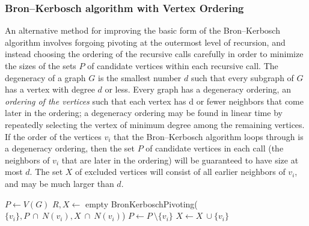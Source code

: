 \documentclass[10pt]{article} %
\begin{document}
\subsubsection{Bron–Kerbosch algorithm with Vertex Ordering}
An alternative method for improving the basic form of the Bron–Kerbosch algorithm involves forgoing pivoting at the outermost level of recursion, and instead choosing the ordering of the recursive calls carefully in order to minimize the sizes of the sets $P$ of candidate vertices within each recursive call. The degeneracy of a graph $G$ is the smallest number $d$ such that every subgraph of $G$ has a vertex with degree $d$ or less. Every graph has a degeneracy ordering, an \textit{ordering of the vertices} such that each vertex has d or fewer neighbors that come later in the ordering; a degeneracy ordering may be found in linear time by repeatedly selecting the vertex of minimum degree among the remaining vertices. If the order of the vertices $v_{i}$ that the Bron–Kerbosch algorithm loops through is a degeneracy ordering, then the set $P$ of candidate vertices in each call (the neighbors of $v_{i}$ that are later in the ordering) will be guaranteed to have size at most $d$. The set $X$ of excluded vertices will consist of all earlier neighbors of $v_{i}$, and may be much larger than $d$.
\begin{algorithm}
\caption{Bron–Kerbosch algorithm with Vertex Ordering}
\label{alg:BK with Vertex}
\begin{algorithmic}[1] %
    \State $P \gets V(G)$
    \State $R, X \gets$ empty
        \State BronKerboschPivoting($\{v_{i}\}, P\ \cap\ N(v_{i}), X\ \cap \ N(v_{i})$)
        \State $P \gets P\ \setminus \{v_{i}\}$
        \State $X \gets X\ \cup \{v_{i}\}$
    \EndFor
\EndProcedure
\end{algorithmic}
\end{algorithm}
\end{document}
